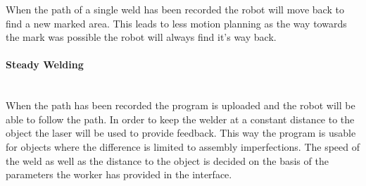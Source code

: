 When the path of a single weld has been recorded the robot will move back to find a new marked area. This leads to less motion planning as the way towards the mark was possible the robot will always find it's way back.

\paragraph*{Steady Welding}~\\
When the path has been recorded the program is uploaded and the robot will be able to follow the path.
In order to keep the welder at a constant distance to the object the laser will be used to provide feedback. 
This way the program is usable for objects where the difference is limited to assembly imperfections.
The speed of the weld as well as the distance to the object is decided on the basis of the parameters the worker has provided in the interface.